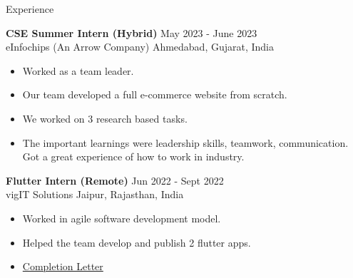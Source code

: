 \documentclass{resume}
\begin{document}
\begin{rSection}{Experience}
\vspace{-1em}
    \item \textbf{CSE Summer Intern (Hybrid)}
    \hfill May 2023 - June 2023
    \\ eInfochips (An Arrow Company)
    \hfill Ahmedabad, Gujarat, India
    \begin{itemize}
        \setlength\itemsep{-0.5em}
        \item Worked as a team leader.
        \item Our team developed a full e-commerce website from scratch.
        \item We worked on 3 research based tasks.
        \item The important learnings were leadership skills, teamwork, communication.
        \\ Got a great experience of how to work in industry.
    \end{itemize}
    
    \item \textbf{Flutter Intern (Remote)}
    \hfill Jun 2022 - Sept 2022
    \\ vigIT Solutions
    \hfill Jaipur, Rajasthan, India
    \begin{itemize}
        \setlength\itemsep{-0.5em}
        \item Worked in agile software development model.
        \item Helped the team develop and publish 2 flutter apps.
        \item \href{https://drive.google.com/file/d/1yF5baJ-uIWpwAHL0Sd-CwycYHjbyFumW/view?usp=sharing}{Completion Letter}
    \end{itemize}
\end{rSection}
\end{document}
